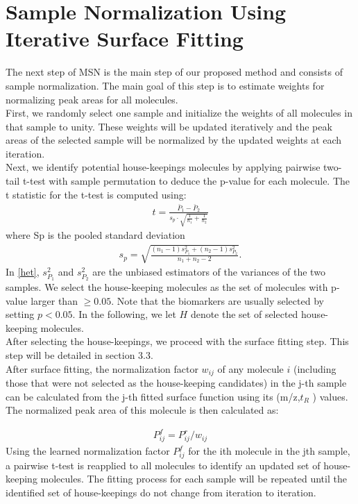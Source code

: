 \section{Sample Normalization Using Iterative Surface Fitting}
The next step of MSN is the main step of our proposed method and consists of sample normalization. The main goal of this step is to estimate weights for normalizing peak areas for all molecules.\\
\indent First, we randomly select one sample and  initialize the weights of all molecules in that sample to unity. These weights will be updated iteratively and the peak areas of the selected sample will be normalized by the updated weights at each iteration.\\
\indent Next, we identify potential house-keepings molecules by applying pairwise
two-tail t-test with sample permutation to deduce the p-value for each molecule. The t statistic for the t-test is computed using:
\begin{eqnarray} 
t={\frac {{\bar {P}}_{1}-{\bar {P}}_{2}}{s_{p}\cdot {\sqrt {{\frac {1}{n_{1}}}+{\frac {1}{n_{2}}}}}}}
\end{eqnarray}
where Sp is the pooled standard deviation
\begin{eqnarray}\label{het} 
 s_{p}={\sqrt {\frac {\left(n_{1}-1\right)s_{P_{1}}^{2}+\left(n_{2}-1\right)s_{P_{2}}^{2}}{n_{1}+n_{2}-2}}}.
\end{eqnarray}
\indent In \ref{het}, $s_{P_1}^2$ and $s_{P_2}^2$ are the unbiased estimators of the variances of the two samples. 
We select the house-keeping molecules as the set of molecules with p-value larger than $ \geq 0.05$. Note that the biomarkers are usually selected by setting $p <0.05$. In the following, we let $H$ denote the set of selected house-keeping molecules.\\
\indent After selecting the house-keepings, we proceed with the surface fitting step. This step will be detailed in section 3.3. \\
\indent After surface fitting, the normalization factor $w_{ij}$ of any molecule $i$ (including those that were not selected as the house-keeping candidates) in the j-th sample can be calculated from the j-th fitted surface function using its (m/z,$t_R$ ) values. The normalized peak area of this molecule is then calculated as:

\begin{eqnarray}\label{eq:3}
P_{ij}^f= P_{ij}^r / w_{ij}
\end{eqnarray}
Using the learned normalization factor $P_{ij}^f$ for the ith molecule in the jth sample, a pairwise t-test is reapplied to all molecules to identify an updated set of house-keeping molecules.
The fitting process for each sample will be repeated until the identified set of house-keepings do not change from iteration to iteration.

